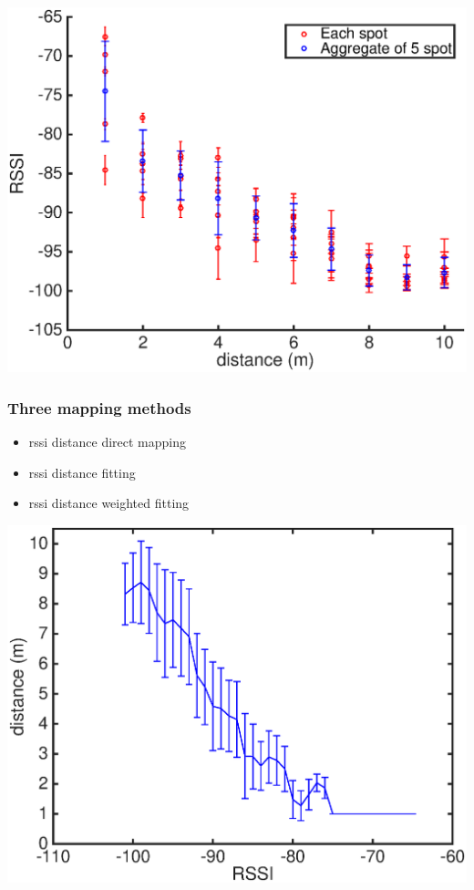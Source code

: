 \documentclass[11pt]{beamer}
\author{Hong Xiong}
\begin{document}

\begin{frame}
\includegraphics[width=\textwidth]{outdoor_dis_vs_RSSI_5_spot.eps} 
\end{frame}

\begin{frame}
\frametitle{Three mapping methods}
\begin{itemize}
\item rssi distance direct mapping
\item rssi distance fitting
\item rssi distance weighted fitting
\end{itemize}
\end{frame}

\begin{frame}
\includegraphics[width=\textwidth]{outdoor_RSSI_vs_dis.eps} 
\end{frame}
\end{document}
